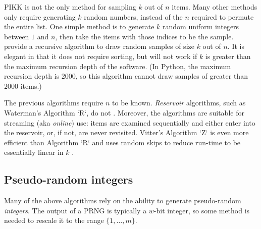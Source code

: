 \documentclass[graybox]{svmult}
\newcommand*\Let[2]{\State #1 $\gets$ #2}
\begin{document}
      
PIKK is not the only method for sampling $k$ out of $n$ items.
Many other methods only require generating $k$ random numbers, instead of the $n$ required to permute the entire list.
One simple method is to generate $k$ random uniform integers between $1$ and $n$, then take the items with those indices to be the sample.
\cite{cormen_introduction_2009} provide a recursive algorithm to draw random samples of size $k$ out of $n$.
It is elegant in that it does not require sorting, but will not work if $k$ is greater than the maximum recursion depth of the software.
(In Python, the maximum recursion depth is $2000$, so this algorithm cannot draw samples of greater than $2000$ items.)
%
%
%
%
%

The previous algorithms require $n$ to be known.
\emph{Reservoir} algorithms, such as Waterman's Algorithm `R`, do not  \cite{knuth_art_1997}.
Moreover, the algorithms are suitable for streaming (aka \emph{online}) use: items are examined
sequentially and either enter into the reservoir, or, if not, are never revisited.
Vitter's Algorithm `Z` is even more efficient than Algorithm `R` and uses random skips to reduce run-time to be essentially linear in $k$ \cite{vitter (1985)}.


\subsection{Pseudo-random integers}
\label{sec:integers}
Many of the above algorithms rely on the ability to generate pseudo-random \emph{integers}.
The output of a PRNG is typically a $w$-bit integer, so some method is needed to rescale it to the range $\{1, \ldots, m\}$.
\end{document}
